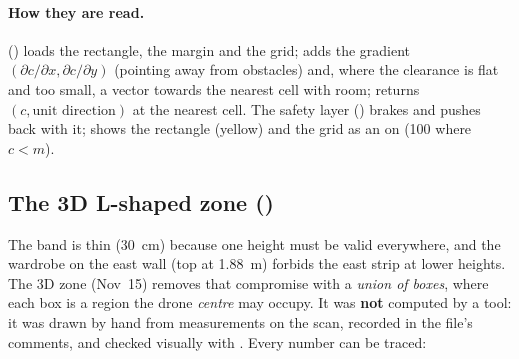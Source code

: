\paragraph{How they are read.}  () loads the
rectangle, the margin and the grid;  adds the gradient $(\partial c/\partial x, \partial
c/\partial y)$ (pointing away from obstacles) and, where the clearance is flat and too small, a vector towards the
nearest cell with room;  returns $(c, \text{unit direction})$ at the nearest cell.
The safety layer () brakes and pushes back with it;  shows the
rectangle (yellow) and the grid as an  on  (100 where $c < m$).

\subsection{The 3D L-shaped zone (\texorpdfstring{}{flight\_zone\_3d.yaml})}

The band is thin (30~cm) because one height must be valid everywhere, and the wardrobe on the east wall
(top at 1.88~m) forbids the east strip at lower heights. The 3D zone (Nov~15) removes that compromise with a
\emph{union of boxes}, where each box is a region the drone \emph{centre} may occupy. It was \textbf{not} computed
by a tool: it was drawn by hand from measurements on the scan, recorded in the file's comments, and checked visually
with . Every number can be traced:

